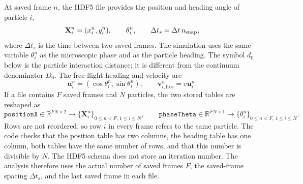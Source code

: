 \documentclass[11pt]{article}
\numberwithin{equation}{section}
\begin{document}
At saved frame $n$, the HDF5 file provides the position and heading angle of
particle $i$,
\begin{equation}
  \mathbf X_i^n=(x_i^n,y_i^n),
  \qquad
  \theta_i^n,
  \qquad
  \Delta t_s=\Delta t\,n_{\rm snap},
  \label{eq:boundary_raw_data}
\end{equation}
where $\Delta t_s$ is the time between two saved frames.  The simulation uses
the same variable $\theta_i^n$ as the microscopic phase and as the particle
heading.  The symbol $d_0$ below is the particle interaction distance; it is
different from the continuum denominator $D_0$.  The free-flight heading and
velocity are
\begin{equation}
  \mathbf u_i^n=(\cos\theta_i^n,\sin\theta_i^n),
  \qquad
  \mathbf v_{i,\mathrm{free}}^n=v\mathbf u_i^n.
  \label{eq:boundary_heading_velocity}
\end{equation}
If a file contains $F$ saved frames and $N$ particles, the two stored tables
are reshaped as
\begin{equation}
 \mathtt{positionX}\in\mathbb R^{FN\times2}
 \longrightarrow \{\mathbf X_i^n\}_{0\le n<F,\,1\le i\le N},
 \qquad
 \mathtt{phaseTheta}\in\mathbb R^{FN\times1}
 \longrightarrow \{\theta_i^n\}_{0\le n<F,\,1\le i\le N}.
 \label{eq:hdf5_boundary_reshape}
\end{equation}
Rows are not reordered, so row $i$ in every frame refers to the same particle.
The code checks that the position table has two columns, the heading table has
one column, both tables have the same number of rows, and that this number is
divisible by $N$.  The HDF5 schema does not store an iteration number.  The
analysis therefore uses the actual number of saved frames $F$, the saved-frame
spacing $\Delta t_s$, and the last saved frame in each file.
\end{document}
